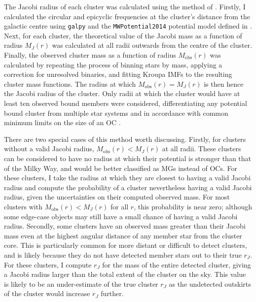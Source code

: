 The Jacobi radius of each cluster was calculated using the method of \cite{meingast_extended_2021}. Firstly, I calculated the circular and epicyclic frequencies at the cluster's distance from the galactic centre using \texttt{galpy} \citep{bovy_galpy_python_2015} and the \texttt{MWPotential2014} potential model defined in \cite{bovy_galpy_python_2015}. Next, for each cluster, the theoretical value of the Jacobi mass as a function of radius $M_J(r)$ was calculated at all radii outwards from the centre of the cluster. Finally, the observed cluster mass as a function of radius $M_\text{obs}(r)$ was calculated by repeating the process of binning stars by mass, applying a correction for unresolved binaries, and fitting Kroupa IMFs to the resulting cluster mass functions. The radius at which $M_\text{obs}(r) = M_J(r)$ is then hence the Jacobi radius of the cluster. Only radii at which the cluster would have at least ten observed bound members were considered, differentiating any potential bound cluster from multiple star systems and in accordance with common minimum limits on the size of an OC \citep{cantat-gaudin_clusters_2020,portegies_zwart_young_2010}.

There are two special cases of this method worth discussing. Firstly, for clusters without a valid Jacobi radius, $M_\text{obs}(r)<M_J(r)$ at all radii. These clusters can be considered to have no radius at which their potential is stronger than that of the Milky Way, and would be better classified as MGs instead of OCs. For these clusters, I take the radius at which they are closest to having a valid Jacobi radius and compute the probability of a cluster nevertheless having a valid Jacobi radius, given the uncertainties on their computed observed mass. For most clusters with $M_\text{obs}(r)<M_J(r)$ for all $r$, this probability is near zero; although some edge-case objects may still have a small chance of having a valid Jacobi radius. Secondly, some clusters have an observed mass greater than their Jacobi mass even at the highest angular distance of any member star from the cluster core. This is particularly common for more distant or difficult to detect clusters, and is likely because they do not have detected member stars out to their true $r_J$. For these clusters, I compute $r_J$ for the mass of the entire detected cluster, giving a Jacobi radius larger than the total extent of the cluster on the sky. This value is likely to be an under-estimate of the true cluster $r_J$ as the undetected outskirts of the cluster would increase $r_J$ further.

